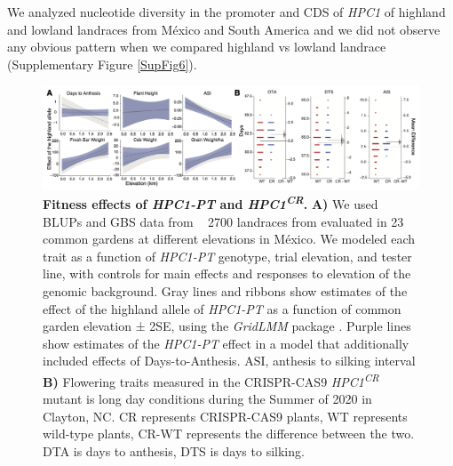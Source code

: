 \documentclass[9pt,twocolumn,twoside,lineno]{BioRxiv}
\begin{document}
We analyzed nucleotide diversity in the promoter and CDS of \textit{HPC1} of highland and lowland landraces from México and South America and we did not observe any obvious pattern  when we compared highland vs lowland landrace (Supplementary Figure \ref{SupFig6}).

\begin{figure}[!ht]
\begin{center}
\includegraphics[width=0.8\paperwidth]{Figures/Fig_4.png}
\caption{\textbf{Fitness effects of \textit{HPC1-PT} and \textit{HPC1\textsuperscript{CR}}.} 
\textbf{A)} We used BLUPs and GBS data from ~ 2700 landraces from \cite{Gates2019-xu} evaluated in 23 common gardens at different elevations in México. 
We modeled each trait as a function of \textit{HPC1-PT} genotype, trial elevation, and tester line, with controls for main effects and responses to elevation of the genomic background. 
Gray lines and ribbons show estimates of the effect of the highland allele of \textit{HPC1-PT} as a function of common garden elevation ± 2SE, using the \textit{GridLMM} package \cite{Runcie2019-Gr}. 
Purple lines show estimates of the \textit{HPC1-PT} effect in a model that additionally included effects of Days-to-Anthesis. ASI, anthesis to silking interval
\textbf{B)} Flowering traits measured in the CRISPR-CAS9 \textit{HPC1\textsuperscript{CR}} mutant is long day conditions during the Summer of 2020 in Clayton, NC. 
CR represents CRISPR-CAS9 plants, WT represents wild-type plants, CR-WT represents the difference between the two. DTA is days to anthesis, DTS is days to silking.} 
\label{Fig4}
\end{center}
\end{figure}
\end{document}
